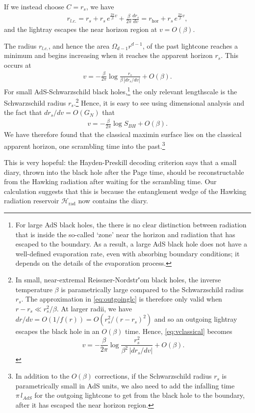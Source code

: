 \documentclass[12pt]{article}
\begin{document}
If we instead choose $C=r_s$, we have
\begin{align} \label{eq:outgoinglc}
r_{l.c.} = r_s + r_s \,e^{\frac{2\pi}{\beta}v} + \frac{\beta}{2 \pi} \frac{d r_s}{d v} = r_\text{hor} + r_s\,e^{\frac{2\pi}{\beta}v},
\end{align}
and the lightray escapes the near horizon region at $v = O(\beta)$.

The radius $r_{l.c.}$, and hence the area $\Omega_{d-1}r^{d-1}$, of the past lightcone reaches a minimum and begins increasing when it reaches the apparent horizon $r_s$. This occurs at
\begin{align} \label{eq:vclassical}
v = - \frac{\beta}{2\pi} \log \frac{r_s}{\beta\, |d r_s/d v|} + O(\beta).
\end{align}
For small AdS-Schwarzschild black holes,\footnote{For large AdS black holes, the there is no clear distinction between radiation that is inside the so-called `zone' near the horizon and radiation that has escaped to the boundary. As a result, a large AdS black hole does not have a well-defined evaporation rate, even with absorbing boundary conditions; it depends on the details of the evaporation process.} the only relevant lengthscale is the Schwarzschild radius $r_s$.\footnote{\label{foot:nearextremal} In small, near-extremal Reissner-Nordstr\''{o}m black holes, the inverse temperature $\beta$ is parametrically large compared to the Schwarzschild radius $r_s$. The approximation in \eqref{eq:outgoinglc} is therefore only valid when $r - r_s \ll r_s^2 / \beta$. At larger radii, we have $dr/dv = O(1/f(r)) = O(r_s^2/(r - r_s)^2)$ and so an outgoing lightray escapes the black hole in an $O(\beta)$ time. Hence, \eqref{eq:vclassical} becomes $$v = - \frac{\beta}{2\pi} \log \frac{r_s^2}{\beta^2\, |d r_s/d v|} + O(\beta).$$} Hence, it is easy to see using dimensional analysis and the fact that $d r_s/d v = O(G_N)$ that
\begin{align}
v = - \frac{\beta}{2 \pi} \log S_{BH} + O(\beta).
\end{align}
We have therefore found that the classical maximin surface lies on the classical apparent horizon, one scrambling time into the past.\footnote{In addition to the $O(\beta)$ corrections, if the Schwarzschild radius $r_s$ is parametrically small in AdS units, we also need to add the infalling time $\pi\, l_{AdS}$ for the outgoing lightcone to get from the black hole to the boundary, after it has escaped the near horizon region.} 

This is very hopeful: the Hayden-Preskill decoding criterion says that a small diary, thrown into the black hole after the Page time, should be reconstructable from the Hawking radiation after waiting for the scrambling time. Our calculation suggests that this is because the entanglement wedge of the Hawking radiation reservoir $\mathcal{H}_\text{rad}$ now contains the diary.
\end{document}
